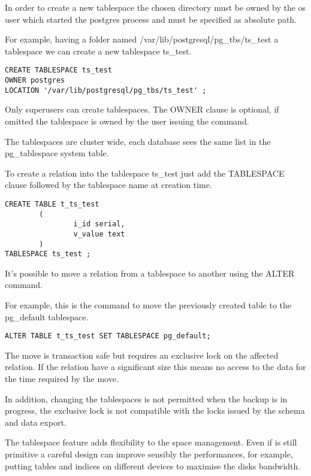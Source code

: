 In order to create a new tablespace the chosen directory must be owned by 
the os user which started the postgres process and must be specified as 
absolute path. 

For example, having a folder named /var/lib/postgresql/pg\_tbs/ts\_test a 
tablespace we can create a new tablespace ts\_test.

\begin{lstlisting}[style=pgsql]
CREATE TABLESPACE ts_test 
OWNER postgres
LOCATION '/var/lib/postgresql/pg_tbs/ts_test' ;

\end{lstlisting}

Only superusers can create tablespaces. The OWNER clause is optional, if 
omitted the tablespace is owned by the user issuing the command.

The tablespaces are cluster wide, each database sees the same list in the 
pg\_tablespace system table.

To create a relation into the tablespace ts\_test just add the TABLESPACE 
clause followed by the tablespace name at creation 
time.

\begin{lstlisting}[style=pgsql]
CREATE TABLE t_ts_test
        (
                i_id serial,
                v_value text
        )
TABLESPACE ts_test ;

\end{lstlisting}

It's possible to move a relation from a tablespace to another using the 
ALTER command.

For example, this is the command to move the previously created table to the 
pg\_default tablespace.

\begin{lstlisting}[style=pgsql]
ALTER TABLE t_ts_test SET TABLESPACE pg_default;
\end{lstlisting}

The move is transaction safe but requires an exclusive lock on the affected 
relation. If the relation have a significant size this means no access to 
the data for the time required by the move.

In addition, changing the tablespaces is not permitted when the backup is in 
progress, the exclusive lock is not compatible with the locks issued by the 
schema and data export.

The tablespace feature adds flexibility to the space management. Even if is 
still primitive a careful design can improve sensibly the performances, for 
example, putting tables and indices on different devices to maximise the disks 
bandwidth.

